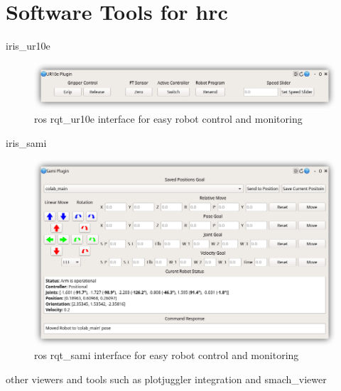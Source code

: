 \section{Software Tools for \ac{hrc}}
\label{sec:tools-hrc}

\par iris\_ur10e

\begin{figure}[h]
    \centering
    \includegraphics[width=0.9\linewidth]{figs/chp5/rqt_ur10e.png}
    \caption{\ac{ros} rqt\_ur10e interface for easy robot control and monitoring}
    \label{fig:rqt_ur10e}
\end{figure}

\par iris\_sami

\begin{figure}[h]
    \centering
    \includegraphics[width=0.9\linewidth]{figs/chp5/rqt_sami.png}
    \caption{\ac{ros} rqt\_sami interface for easy robot control and monitoring}
    \label{fig:rqt_sami}
\end{figure}


\par other viewers and tools such as plotjuggler integration and smach\_viewer